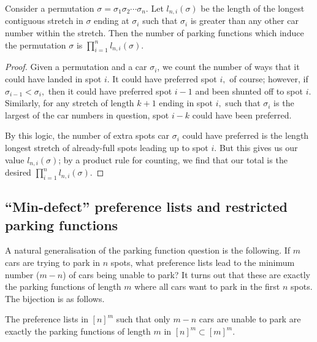 \begin{proposition}
    Consider a permutation $\sigma=\sigma_1\sigma_2\cdots\sigma_n.$ Let $l_{n,i}(\sigma)$ be the length of the longest contiguous stretch in $\sigma$ ending at $\sigma_i$ such that $\sigma_i$ is greater than any other car number within the stretch. Then the number of parking functions which induce the permutation $\sigma$ is $\displaystyle\prod_{i=1}^n l_{n,i}(\sigma).$
\end{proposition}

\begin{proof}
    Given a permutation and a car $\sigma_i$, we count the number of ways that it could have landed in spot $i.$ It could have preferred spot $i,$ of course; however, if $\sigma_{i-1}<\sigma_i,$ then it could have preferred spot $i-1$ and been shunted off to spot $i.$ Similarly, for any stretch of length $k+1$ ending in spot $i,$ such that $\sigma_i$ is the largest of the car numbers in question, spot $i-k$ could have been preferred.

    By this logic, the number of extra spots car $\sigma_i$ could have preferred is the length longest stretch of already-full spots leading up to spot $i.$ But this gives us our value $l_{n,i}(\sigma)$; by a product rule for counting, we find that our total is the desired $\displaystyle\prod_{i=1}^n l_{n,i}(\sigma).$
\end{proof}

\subsection*{``Min-defect'' preference lists and restricted parking functions}

A natural generalisation of the parking function question is the following. If $m$ cars are trying to park in $n$ spots, what preference lists lead to the minimum number ($m - n$) of cars being unable to park? It turns out that these are exactly the parking functions of length $m$ where all cars want to park in the first $n$ spots. The bijection is as follows.

\begin{proposition}
    The preference lists in $[n]^m$ such that only $m - n$ cars are unable to park are exactly the parking functions of length $m$ in $[n]^m \subset [m]^m$.
\end{proposition}

